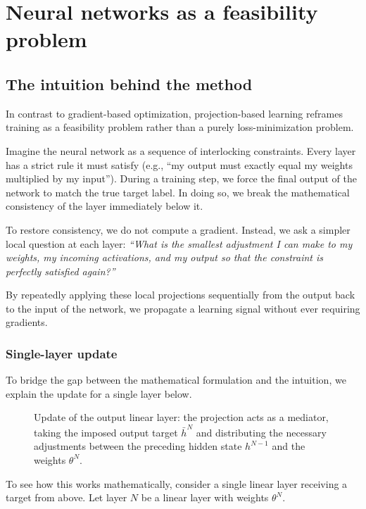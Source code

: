 \documentclass{article}
\theoremstyle{plain}
\theoremstyle{definition}
\theoremstyle{remark}
\begin{document}
\section{Neural networks as a feasibility problem} \label{sec:nn_feas}

\subsection{The intuition behind the method}
In contrast to gradient-based optimization, projection-based learning reframes training as a feasibility problem rather than a purely loss-minimization problem.

Imagine the neural network as a sequence of interlocking constraints. Every layer has a strict rule it must satisfy (e.g., ``my output must exactly equal my weights multiplied by my input''). During a training step, we force the final output of the network to match the true target label. In doing so, we break the mathematical consistency of the layer immediately below it.

To restore consistency, we do not compute a gradient. Instead, we ask a simpler local question at each layer: \textit{``What is the smallest adjustment I can make to my weights, my incoming activations, and my output so that the constraint is perfectly satisfied again?''}

By repeatedly applying these local projections sequentially from the output back to the input of the network, we propagate a learning signal without ever requiring gradients.



\subsubsection{Single-layer update}
To bridge the gap between the mathematical formulation and the intuition, we explain the update for a single layer below.
\begin{figure}[htbp]
\centering
\resizebox{\textwidth}{!}{%

}
\caption{Update of the output linear layer: the projection acts as a mediator, taking the imposed output target $\bar{h}^{N}$ and distributing the necessary adjustments between the preceding hidden state $h^{N-1}$ and the weights $\theta^{N}$.}
\end{figure}

To see how this works mathematically, consider a single linear layer receiving a target from above. Let layer $N$ be a linear layer with weights $\theta^{N}$.
\end{document}
